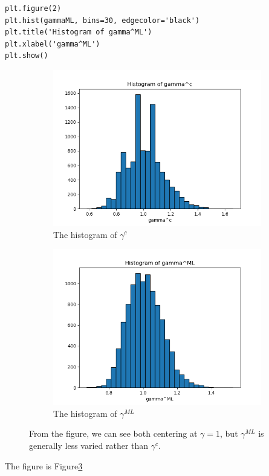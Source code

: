 \documentclass[preprint,12pt]{elsarticle}
\begin{document}
\begin{enumerate}[label=\alph*]
\begin{lstlisting}
plt.figure(2)
plt.hist(gammaML, bins=30, edgecolor='black')
plt.title('Histogram of gamma^ML')
plt.xlabel('gamma^ML')
plt.show()
        \end{lstlisting}
        \begin{figure}[htbp!]
            \center
            \begin{subfigure}{0.8\textwidth}
                \includegraphics[width = \textwidth]{4.png}
                \caption{The histogram of $\gamma^c$}
                \label{fig:31}
            \end{subfigure}
            \begin{subfigure}{0.8\textwidth}
                \includegraphics[width = \textwidth]{5.png}
                \caption{The histogram of $\gamma^{ML}$}
                \label{fig:32}
            \end{subfigure}
            \caption{From the figure, we can see both centering at $\gamma=1$, but 
            $\gamma^{ML}$ is generally less varied rather than $\gamma^c$.}
            \label{fig:3}
        \end{figure}

        The figure is Figure\ref{fig:3}
    \end{enumerate}
\end{document}
